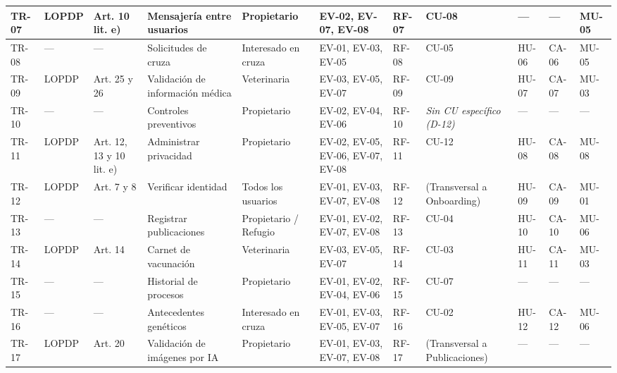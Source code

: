 \documentclass[journal,onecolumn]{IEEEtran}
\begin{document}
\begin{landscape}
\begin{longtable}{@{}p{0.8cm} p{1.3cm} p{1.5cm} p{2.2cm} p{1.5cm} p{1.8cm} p{1.6cm} p{1.3cm} p{1.3cm} p{1.3cm} p{1.5cm}@{}}
			TR-07 & LOPDP & Art. 10 lit. e) & Mensajería entre usuarios & Propietario & EV-02, EV-07, EV-08 & RF-07 & CU-08 & --- & --- & MU-05 \\ \midrule
			
			TR-08 & --- & --- & Solicitudes de cruza & Interesado en cruza & EV-01, EV-03, EV-05 & RF-08 & CU-05 & HU-06 & CA-06 & MU-05 \\ \midrule
			
			TR-09 & LOPDP & Art. 25 y 26 & Validación de información médica & Veterinaria & EV-03, EV-05, EV-07 & RF-09 & CU-09 & HU-07 & CA-07 & MU-03 \\ \midrule
			
			TR-10 & --- & --- & Controles preventivos & Propietario & EV-02, EV-04, EV-06 & RF-10 & \emph{Sin CU específico (D-12)} & --- & --- & --- \\ \midrule
			
			TR-11 & LOPDP & Art. 12, 13 y 10 lit. e) & Administrar privacidad & Propietario & EV-02, EV-05, EV-06, EV-07, EV-08 & RF-11 & CU-12 & HU-08 & CA-08 & MU-08 \\ \midrule
			
			TR-12 & LOPDP & Art. 7 y 8 & Verificar identidad & Todos los usuarios & EV-01, EV-03, EV-07, EV-08 & RF-12 & (Transversal a Onboarding) & HU-09 & CA-09 & MU-01 \\ \midrule
			
			TR-13 & --- & --- & Registrar publicaciones & Propietario / Refugio & EV-01, EV-02, EV-07, EV-08 & RF-13 & CU-04 & HU-10 & CA-10 & MU-06 \\ \midrule
			
			TR-14 & LOPDP & Art. 14 & Carnet de vacunación & Veterinaria & EV-03, EV-05, EV-07 & RF-14 & CU-03 & HU-11 & CA-11 & MU-03 \\ \midrule
			
			TR-15 & --- & --- & Historial de procesos & Propietario & EV-01, EV-02, EV-04, EV-06 & RF-15 & CU-07 & --- & --- & --- \\ \midrule
			
			TR-16 & --- & --- & Antecedentes genéticos & Interesado en cruza & EV-01, EV-03, EV-05, EV-07 & RF-16 & CU-02 & HU-12 & CA-12 & MU-06 \\ \midrule
			
			TR-17 & LOPDP & Art. 20 & Validación de imágenes por IA & Propietario & EV-01, EV-03, EV-07, EV-08 & RF-17 & (Transversal a Publicaciones) & --- & --- & --- \\ \midrule
			

\end{longtable}
\end{landscape}
\end{document}
